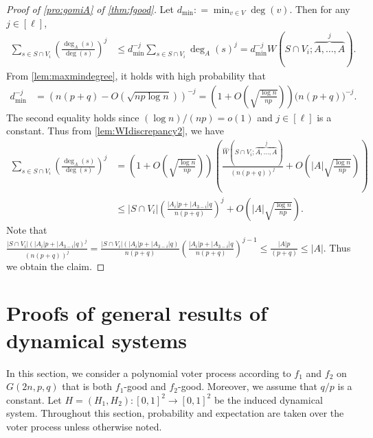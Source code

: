 \documentclass[letterpaper,11pt]{article}
\newcommand{\Wh}{\hat{W}}
\def\defeq{\mathrel{\mathop:}=}%
\begin{document}
%
\begin{proof}[Proof of  \ref{pro:gomiA} of \cref{thm:fgood}]
Let $d_{\min}\defeq \min_{v\in V}\deg(v)$.
Then for any $j\in [\ell]$, 
\begin{align*}
\sum_{s\in S\cap V_i}\left(\frac{\deg_A(s)}{\deg(s)}\right)^j
&\leq d_{\min}^{-j}\sum_{s\in S\cap V_i}\deg_A(s)^j
=d_{\min}^{-j}W(S\cap V_i;\overbrace{A,\ldots,A}^{j}).
\end{align*}
From \cref{lem:maxmindegree}, it holds with high probability that
\begin{align*}
d_{\min}^{-j}
&=\left(n(p+q)-O(\sqrt{np\log n})\right)^{-j}
=\left(1+O\left(\sqrt{\frac{\log n}{np}}\right)\right)\bigl(n(p+q)\bigr)^{-j}.
\end{align*}
The second equality holds since $(\log n)/(np)=o(1)$ and $j\in [\ell]$ is a constant.
Thus from \cref{lem:WIdiscrepancy2}, we have
\begin{align*}
\sum_{s\in S\cap V_i}\left(\frac{\deg_A(s)}{\deg(s)}\right)^j
&=\left(1+O\left(\sqrt{\frac{\log n}{np}}\right)\right)\left(\frac{\Wh(S\cap V_i;\overbrace{A,\ldots,A}^{j})}{(n(p+q))^j}+O\left(|A|\sqrt{\frac{\log n}{np}}\right)\right)\\
&\leq |S\cap V_i|\left(\frac{|A_i|p+|A_{3-i}|q}{n(p+q)}\right)^j+O\left(|A|\sqrt{\frac{\log n}{np}}\right).
\end{align*}
Note that $\frac{|S\cap V_i|(|A_i|p+|A_{3-i}|q)^{j}}{(n(p+q))^j}= \frac{|S\cap V_i|(|A_i|p+|A_{3-i}|q)}{n(p+q)}\left(\frac{|A_i|p+|A_{3-i}|q}{n(p+q)}\right)^{j-1}\leq\frac{|A|p}{(p+q)}\leq  |A|$.
Thus we obtain the claim.
\end{proof}







\section{Proofs of general results of dynamical systems}\label{sec:generaljacobi}
In this section, we consider a polynomial voter process according to $f_1$ and $f_2$ on $G(2n,p,q)$ that is both $f_1$-good and $f_2$-good.
Moreover, we assume that $q/p$ is a constant.
Let $H=(H_1,H_2):[0,1]^2\to[0,1]^2$ be the induced dynamical system.
Throughout this section, probability and expectation are taken over the voter process unless otherwise noted.
\end{document}

